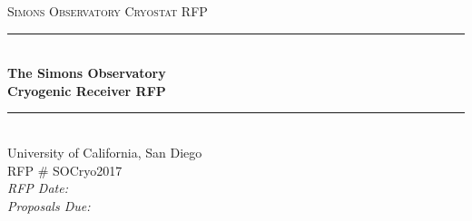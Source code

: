 
\begin{titlepage}

  \newcommand{\HRule}{\rule{\linewidth}{0.5mm}} %

  \center %



  \textsc{\Large Simons Observatory Cryostat RFP}\\[0.5cm] %


  \vspace{1.5 cm}
  \HRule \\[0.4cm]
  { \huge \bfseries The Simons Observatory\\ Cryogenic Receiver RFP}\\[0.4cm] %
  \HRule \\[1.5cm]
 

  University of California, San Diego\\
  RFP \# SOCryo2017\\
  \vspace{.5 cm}
  {\it RFP Date:}\\
  \vspace{.5 cm}
  {\it Proposals Due:}\\


\vfill %

\end{titlepage}


\newpage